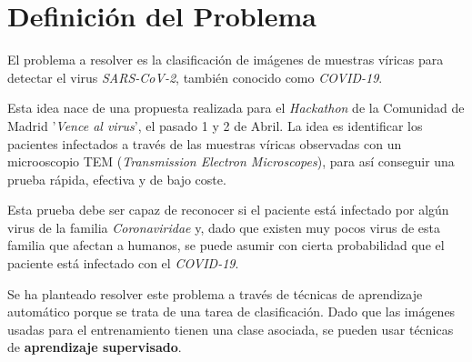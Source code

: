 \documentclass{uc3mpracticas}
\begin{document}
  \frontmatter



  \vspace{40mm}


  \newpage


  \tableofcontents

  \listoffigures
  \newpage

  \mainmatter


  \section{Definición del Problema}

  El problema a resolver es la clasificación de imágenes de muestras víricas para detectar el virus \textit{SARS-CoV-2}, también conocido como \textit{COVID-19}.

  \vspace{2mm}

  Esta idea nace de una propuesta realizada para el \textit{Hackathon} de la Comunidad de Madrid '\textit{Vence al virus}', el pasado 1 y 2 de Abril. La idea es identificar los pacientes infectados a través de las muestras víricas observadas con un microoscopio TEM (\textit{Transmission Electron Microscopes}), para así conseguir una prueba rápida, efectiva y de bajo coste.

  \vspace{2mm}

  Esta prueba debe ser capaz de reconocer si el paciente está infectado por algún virus de la familia \textit{Coronaviridae} y, dado que existen muy pocos virus de esta familia que afectan a humanos, se puede asumir con cierta probabilidad que el paciente está infectado con el \textit{COVID-19}.

  \vspace{3mm}

  Se ha planteado resolver este problema a través de técnicas de aprendizaje automático porque se trata de una tarea de clasificación. Dado que las imágenes usadas para el entrenamiento tienen una clase asociada, se pueden usar técnicas de \textbf{aprendizaje supervisado}.
  \vspace{2mm}
\end{document}
